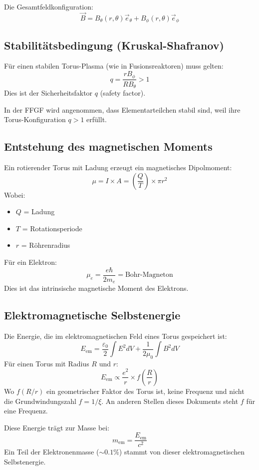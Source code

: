 	Die Gesamtfeldkonfiguration:
	\[
	\vec{B} = B_\theta(r, \theta) \vec{e}_\theta + B_\phi(r, \theta) \vec{e}_\phi
	\]
	
	\subsection{Stabilitätsbedingung (Kruskal-Shafranov)}
	Für einen stabilen Torus-Plasma (wie in Fusionsreaktoren) muss gelten:
	\[
	q = \frac{r B_\phi}{R B_\theta} > 1
	\]
	Dies ist der Sicherheitsfaktor \( q \) (safety factor).
	
	In der FFGF wird angenommen, dass Elementarteilchen stabil sind, weil ihre Torus-Konfiguration \( q > 1 \) erfüllt.
	
	\subsection{Entstehung des magnetischen Moments}
	Ein rotierender Torus mit Ladung erzeugt ein magnetisches Dipolmoment:
	\[
	\mu = I \times A = \left(\frac{Q}{T}\right) \times \pi r^2
	\]
	Wobei:
	\begin{itemize}
		\item \( Q \) = Ladung
		\item \( T \) = Rotationsperiode
		\item \( r \) = Röhrenradius
	\end{itemize}
	
	Für ein Elektron:
	\[
	\mu_e = \frac{e \hbar}{2 m_e} = \text{Bohr-Magneton}
	\]
	Dies ist das intrinsische magnetische Moment des Elektrons.
	
	\subsection{Elektromagnetische Selbstenergie}
	Die Energie, die im elektromagnetischen Feld eines Torus gespeichert ist:
	\[
	E_{\text{em}} = \frac{\varepsilon_0}{2} \int E^2 dV + \frac{1}{2\mu_0} \int B^2 dV
	\]
	Für einen Torus mit Radius \( R \) und \( r \):
	\[
	E_{\text{em}} \propto \frac{e^2}{r} \times f\left(\frac{R}{r}\right)
	\]
	Wo \( f(R/r) \) ein geometrischer Faktor des Torus ist, keine Frequenz und nicht die Grundwindungszahl $f = 1/\xi$. An anderen Stellen dieses Dokuments steht $f$ für eine Frequenz.

	Diese Energie trägt zur Masse bei:
	\[
	m_{\text{em}} = \frac{E_{\text{em}}}{c^2}
	\]
	Ein Teil der Elektronenmasse (\( \sim 0.1\% \)) stammt von dieser elektromagnetischen Selbstenergie.
	
